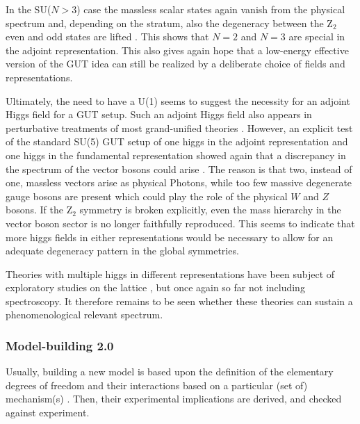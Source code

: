 \documentclass[final,12pt]{article}
\newcommand*{\1}{1\!\!\!\bot}
\begin{document}
In the SU($N>3$) case the massless scalar states again vanish from the physical spectrum and, depending on the stratum, also the degeneracy between the Z$_2$ even and odd states are lifted \cite{Maas:2017xzh}. This shows that $N=2$ and $N=3$ are special in the adjoint representation. This also gives again hope that a low-energy effective version of the GUT idea can still be realized by a deliberate choice of fields and representations.

Ultimately, the need to have a U(1) seems to suggest the necessity for an adjoint Higgs field for a GUT setup. Such an adjoint Higgs field also appears in perturbative treatments of most grand-unified theories \cite{Bohm:2001yx,Langacker:1980js}. However, an explicit test of the standard SU(5) GUT setup of one higgs in the adjoint representation and one higgs in the fundamental representation \cite{Bohm:2001yx,Langacker:1980js} showed again that a discrepancy in the spectrum of the vector bosons could arise \cite{Maas:2017xzh,Pedro:2016hnd}. The reason is that two, instead of one, massless vectors arise as physical Photons, while too few massive degenerate gauge bosons are present which could play the role of the physical $W$ and $Z$ bosons. If the Z$_2$ symmetry is broken explicitly, even the mass hierarchy in the vector boson sector is no longer faithfully reproduced. This seems to indicate that more higgs fields in either representations would be necessary to allow for an adequate degeneracy pattern in the global symmetries.

Theories with multiple higgs in different representations have been subject of exploratory studies on the lattice \cite{Greensite:2008ss}, but once again so far not including spectroscopy. It therefore remains to be seen whether these theories can sustain a phenomenological relevant spectrum.

\subsubsection{Model-building 2.0}\label{sss:model}

Usually, building a new model is based upon the definition of the elementary degrees of freedom and their interactions based on a particular (set of) mechanism(s) \cite{Morrissey:2009tf}. Then, their experimental implications are derived, and checked against experiment. 
\end{document}
